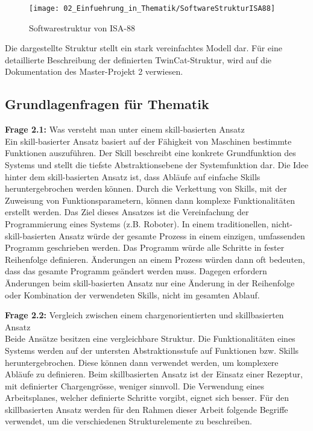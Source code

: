 		\begin{figure}[h!]
			\centering
			\texttt{[image: 02\_Einfuehrung\_in\_Thematik/SoftwareStrukturISA88]}
			\captionsetup{justification=centering}
			\caption{Softwarestruktur von ISA-88}
			\label{fig:Softwarestruktur_ISA88}
		\end{figure}
		
		Die dargestellte Struktur stellt ein stark vereinfachtes Modell dar. Für eine detaillierte Beschreibung der definierten TwinCat-Struktur, wird auf die Dokumentation des Master-Projekt 2 verwiesen.
		
	\vspace{3mm}
	
	\subsection{Grundlagenfragen für Thematik} \label{Grundlagenfragen für Thematik}
	
	\textbf{Frage 2.1:} Was versteht man unter einem skill-basierten Ansatz \vspace{2mm} 
	\\
		Ein skill-basierter Ansatz basiert auf der Fähigkeit von Maschinen bestimmte Funktionen auszuführen. Der Skill beschreibt eine konkrete Grundfunktion des Systems und stellt die tiefste Abstraktionsebene der Systemfunktion dar. Die Idee hinter dem skill-basierten Ansatz ist, dass Abläufe auf einfache Skills heruntergebrochen werden können. Durch die Verkettung von Skills, mit der Zuweisung von Funktionsparametern, können dann komplexe Funktionalitäten erstellt werden. Das Ziel dieses Ansatzes ist die Vereinfachung der Programmierung eines Systems (z.B. Roboter). In einem traditionellen, nicht-skill-basierten Ansatz würde der gesamte Prozess in einem einzigen, umfassenden Programm geschrieben werden. Das Programm würde alle Schritte in fester Reihenfolge definieren. Änderungen an einem Prozess würden dann oft bedeuten, dass das gesamte Programm geändert werden muss. Dagegen erfordern Änderungen beim skill-basierten Ansatz nur eine Änderung in der Reihenfolge oder Kombination der verwendeten Skills, nicht im gesamten Ablauf.
	\vspace{3mm}
	
	\textbf{Frage 2.2:} Vergleich zwischen einem chargenorientierten und skillbasierten Ansatz \vspace{2mm} 
	\\
		Beide Ansätze besitzen eine vergleichbare Struktur. Die Funktionalitäten eines Systems werden auf der untersten Abstraktionsstufe auf Funktionen bzw. Skills heruntergebrochen. Diese können dann verwendet werden, um komplexere Abläufe zu definieren. Beim skillbasierten Ansatz ist der Einsatz einer Rezeptur, mit definierter Chargengrösse, weniger sinnvoll. Die Verwendung eines Arbeitsplanes, welcher definierte Schritte vorgibt, eignet sich besser.
		Für den skillbasierten Ansatz werden für den Rahmen dieser Arbeit folgende Begriffe verwendet, um die verschiedenen Strukturelemente zu beschreiben. 
	
